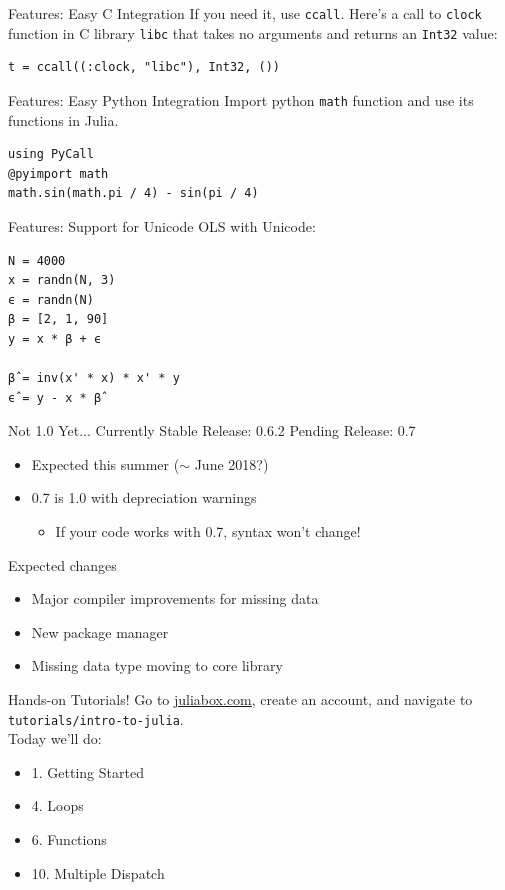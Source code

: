 \documentclass[11pt]{beamer}
\begin{document}
\begin{frame}[fragile]{Features: Easy C Integration}
If you need it, use \texttt{ccall}.
\pause
Here's a call to \texttt{clock} function in C library \texttt{libc} that takes no arguments and returns an \texttt{Int32} value:
\begin{verbatim}
t = ccall((:clock, "libc"), Int32, ())
\end{verbatim}
\end{frame}

\begin{frame}[fragile]{Features: Easy Python Integration}
Import python \texttt{math} function and use its functions in Julia.
\begin{verbatim}
using PyCall
@pyimport math
math.sin(math.pi / 4) - sin(pi / 4)
\end{verbatim}
\end{frame}

\begin{frame}[fragile]{Features: Support for Unicode}
OLS with Unicode:
\begin{verbatim}
N = 4000
x = randn(N, 3)
ϵ = randn(N)
β = [2, 1, 90]
y = x * β + ϵ

β̂ = inv(x' * x) * x' * y
ϵ̂ = y - x * β̂
\end{verbatim}
\end{frame}

\begin{frame}[c]{Not 1.0 Yet...}
Currently Stable Release: 0.6.2
Pending Release: 0.7
\begin{itemize}
    \item Expected this summer ($\sim$ June 2018?)
    \item 0.7 is 1.0 with depreciation warnings
    \begin{itemize}
        \item If your code works with 0.7, syntax won't change!
    \end{itemize}
\end{itemize}
\end{frame}

\begin{frame}[c]{Expected changes}
\begin{itemize}
    \pause \item Major compiler improvements for missing data
    \pause \item New package manager
    \pause \item Missing data type moving to core library
\end{itemize}
\end{frame}

\begin{frame}[c]{Hands-on Tutorials!}
    Go to \url{juliabox.com}, create an account, and navigate to \texttt{tutorials/intro-to-julia}.\\
    Today we'll do:
    \begin{itemize}
        \item 1. Getting Started
        \item 4. Loops
        \item 6. Functions
        \item 10. Multiple Dispatch
    \end{itemize}
\end{frame}
\end{document}
